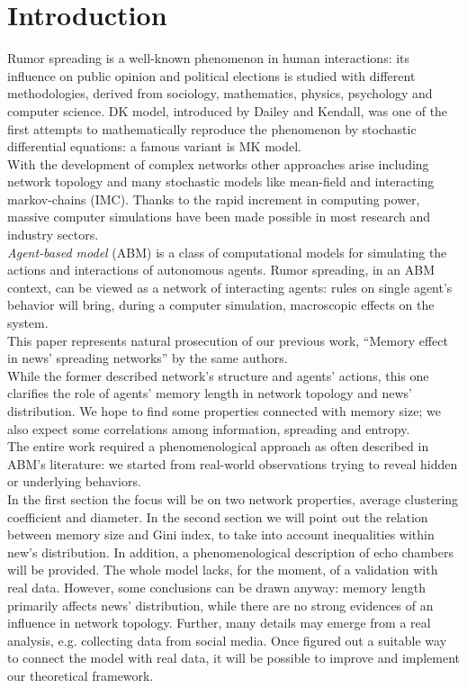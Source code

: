 \section{Introduction} \label{introduction}
Rumor spreading is a well-known phenomenon in human interactions:
its influence on public opinion\cite{publicoprumsp} and political
elections\cite{politicalrumsp} is studied with different
methodologies, derived from sociology, mathematics,
physics, psychology and computer science.
DK model,\cite{DKmodel} introduced by Dailey and Kendall, was one of
the first attempts to mathematically reproduce the phenomenon by
stochastic differential equations: a famous variant is MK
model.\cite{MKmodel}\\
With the development of complex networks other approaches arise
including network topology and many stochastic models
like mean-field\cite{meanfield} and interacting markov-chains\cite{IMC} (IMC).
Thanks to the rapid increment in computing power,
massive computer simulations have been made possible in
most research and industry sectors.\\
\textit{Agent-based model} (ABM) is a class of computational models for
simulating the actions and interactions of autonomous
agents.\cite{Agentbased}
Rumor spreading, in an ABM context, can be viewed as a network
of interacting agents: rules on single agent's behavior
will bring, during a computer simulation, macroscopic
effects on the system.\\
This paper represents natural prosecution of our previous work,
``Memory effect in news' spreading networks'' by the same
authors.\cite{ourpaper}\\
While the former described network's structure and agents' actions,
this one clarifies the role of agents' memory length in network
topology and news' distribution.
We hope to find some properties connected with memory size;
we also expect some correlations among information,
spreading and entropy.\\
The entire work required a phenomenological approach as often
described in ABM's literature:\cite{anintroduction, axtell2000agents, Helbing2012}
we started from real-world observations trying
to reveal hidden or underlying behaviors.\\
In the first section the focus will be on two network properties,
average clustering coefficient and diameter.
In the second section we will point out the relation
between memory size and Gini index, to take into account inequalities
within new's distribution.
In addition, a phenomenological description of echo chambers
will be provided.
The whole model lacks, for the moment, of a validation with real data.
However, some conclusions can be drawn anyway: memory length
primarily affects news' distribution, while there are no strong
evidences of an influence in network topology.
Further, many details may emerge from a real analysis,
e.g. collecting data from social media.
Once figured out a suitable way to connect the model with
real data, it will be possible to improve and implement
our theoretical framework.
